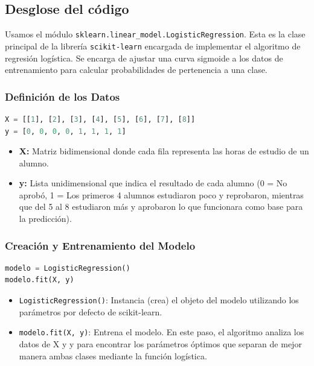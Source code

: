 \documentclass[]{article}
\begin{document}
\subsection{Desglose del código}
Usamos el módulo \texttt{sklearn.linear\_model.LogisticRegression}. Esta es la clase principal de la librería \texttt{scikit-learn} encargada de implementar el algoritmo de regresión logística. Se encarga de ajustar una curva sigmoide a los datos de entrenamiento para calcular probabilidades de pertenencia a una clase.

\subsubsection*{Definición de los Datos}
\begin{lstlisting}[language=Python]
X = [[1], [2], [3], [4], [5], [6], [7], [8]]
y = [0, 0, 0, 0, 1, 1, 1, 1]
\end{lstlisting}
\begin{itemize}
    \item \textbf{X:} Matriz bidimensional donde cada fila representa las horas de estudio de un alumno.
    \item \textbf{y:} Lista unidimensional que indica el resultado de cada alumno (0 = No aprobó, 1 = Los primeros 4 alumnos estudiaron poco y reprobaron, mientras que del 5 al 8 estudiaron más y aprobaron lo que funcionara como base para la predicción).
\end{itemize}

\subsubsection*{Creación y Entrenamiento del Modelo}
\begin{lstlisting}[language=Python]
modelo = LogisticRegression()
modelo.fit(X, y)
\end{lstlisting}
\begin{itemize}
    \item \texttt{LogisticRegression()}: Instancia (crea) el objeto del modelo utilizando los parámetros por defecto de scikit-learn.
    \item \texttt{modelo.fit(X, y)}: Entrena el modelo. En este paso, el algoritmo analiza los datos de X y y para encontrar los parámetros óptimos que separan de mejor manera ambas clases mediante la función logística.
\end{itemize}
\end{document}
